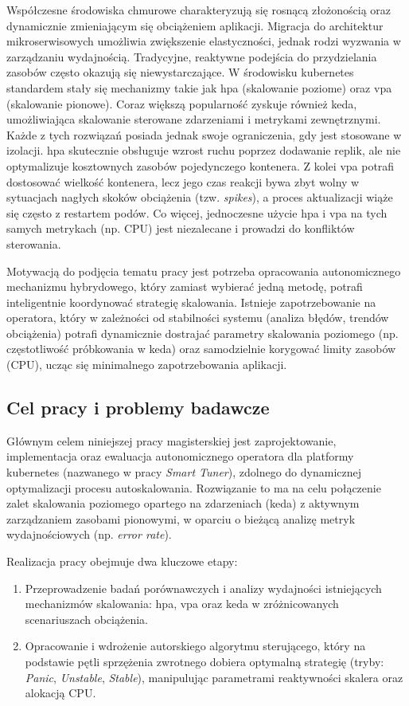 Współczesne środowiska chmurowe charakteryzują się rosnącą złożonością oraz dynamicznie 
zmieniającym się obciążeniem aplikacji.
Migracja do architektur mikroserwisowych 
umożliwia zwiększenie elastyczności, jednak rodzi wyzwania w zarządzaniu wydajnością.
Tradycyjne, reaktywne podejścia do przydzielania zasobów często okazują się niewystarczające.
W środowisku \Gls{kubernetes} standardem stały się mechanizmy takie jak \Gls{hpa} (skalowanie poziome) 
oraz \Gls{vpa} (skalowanie pionowe). Coraz większą popularność zyskuje również \Gls{keda}, 
umożliwiająca skalowanie sterowane zdarzeniami i metrykami zewnętrznymi.
Każde z tych rozwiązań posiada jednak swoje ograniczenia, gdy jest stosowane w izolacji. 
\Gls{hpa} skutecznie obsługuje wzrost ruchu poprzez dodawanie replik, ale nie optymalizuje 
kosztownych zasobów pojedynczego kontenera. Z kolei \Gls{vpa} potrafi dostosować wielkość kontenera, 
lecz jego czas reakcji bywa zbyt wolny w sytuacjach nagłych skoków obciążenia (tzw. \textit{spikes}), 
a proces aktualizacji wiąże się często z restartem podów.
Co więcej, jednoczesne użycie \Gls{hpa} i \Gls{vpa} na tych samych metrykach 
(np. CPU) jest niezalecane i prowadzi do konfliktów sterowania.

Motywacją do podjęcia tematu pracy jest potrzeba opracowania autonomicznego mechanizmu hybrydowego, 
który zamiast wybierać jedną metodę, potrafi inteligentnie koordynować strategię skalowania. 
Istnieje zapotrzebowanie na operatora, który w zależności od stabilności systemu (analiza błędów, 
trendów obciążenia) potrafi dynamicznie dostrajać parametry skalowania poziomego (np. częstotliwość 
próbkowania w \Gls{keda}) oraz samodzielnie korygować limity zasobów (CPU), ucząc się 
minimalnego zapotrzebowania aplikacji.

\subsection{Cel pracy i problemy badawcze}

Głównym celem niniejszej pracy magisterskiej jest zaprojektowanie, implementacja oraz ewaluacja 
autonomicznego operatora dla platformy \Gls{kubernetes} (nazwanego w pracy \textit{Smart Tuner}), 
zdolnego do dynamicznej optymalizacji procesu autoskalowania. Rozwiązanie to ma na celu 
połączenie zalet skalowania poziomego opartego na zdarzeniach (\Gls{keda}) z aktywnym zarządzaniem 
zasobami pionowymi, w oparciu o bieżącą analizę metryk wydajnościowych (np. \textit{error rate}).

Realizacja pracy obejmuje dwa kluczowe etapy:
\begin{enumerate}
    \item Przeprowadzenie badań porównawczych i analizy wydajności istniejących mechanizmów skalowania: 
      \Gls{hpa}, \Gls{vpa} oraz \Gls{keda} w zróżnicowanych scenariuszach obciążenia.
    \item Opracowanie i wdrożenie autorskiego algorytmu sterującego, który na podstawie pętli sprzężenia 
      zwrotnego dobiera optymalną strategię (tryby: \textit{Panic}, \textit{Unstable}, \textit{Stable}),
      manipulując parametrami reaktywności skalera oraz alokacją CPU.
\end{enumerate}

